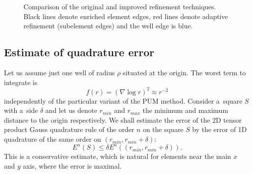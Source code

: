 \documentclass[preprint,12pt]{elsarticle}
\begin{document}
\begin{figure}[!htb]
  \centering    
  \hspace{0pt}
  \caption[Adaptive refinement comparison]
  {Comparison of the original and improved refinement techniques.
   Black lines denote enriched element edges, red lines denote adaptive refinement (subelement edges) and the well
   edge is blue.
  }
  \label{fig:adapt_refinement}
\end{figure}

\subsection{Estimate of quadrature error}

Let us assume just one well of radius $\rho$ situated at the origin. The worst term to integrate is
\begin{equation}
    \label{eq:term-of-interest}
    f(r)=(\nabla \log r )^2 \approx r^{-2}
\end{equation}
%
independently of the particular variant of the PUM method. Consider a~square $S$ with a~side $\delta$ and 
let us denote $r_{min}$ and $r_{max}$ the minimum and maximum distance to the origin respectively.
We shall estimate the error of the 2D tensor product Gauss quadrature rule of the order $n$ on the square $S$  
by the error of 1D quadrature of the same order on $(r_{min}, r_{min}+\delta)$:
\[
  E^n(S) \le \delta E^n((r_{min}, r_{min}+\delta)).
\]
This is a conservative estimate, which is natural for elements near the main $x$ and $y$ axis, where the error is maximal.
\end{document}
